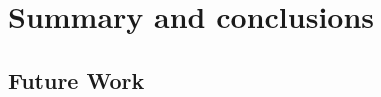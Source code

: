 \documentclass[../main.tex]{subfiles}
\begin{document}
\chapter{Summary and conclusions}

\section{Future Work}
\end{document}

